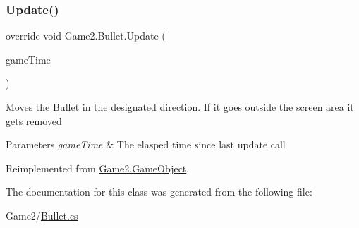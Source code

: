 \subsubsection{\texorpdfstring{Update()}{Update()}}
{\footnotesize\ttfamily override void Game2.\+Bullet.\+Update (\begin{DoxyParamCaption}\item[{Game\+Time}]{game\+Time }\end{DoxyParamCaption})\hspace{0.3cm}{\ttfamily [virtual]}}



Moves the \mbox{\hyperlink{class_game2_1_1_bullet}{Bullet}} in the designated direction. If it goes outside the screen area it gets removed 


\begin{DoxyParams}{Parameters}
{\em game\+Time} & The elasped time since last update call\\
\hline
\end{DoxyParams}


Reimplemented from \mbox{\hyperlink{class_game2_1_1_game_object_a360a294d8a55dcc747c44f8cc1aefe28}{Game2.\+Game\+Object}}.



The documentation for this class was generated from the following file\+:\begin{DoxyCompactItemize}
\item 
Game2/\mbox{\hyperlink{_bullet_8cs}{Bullet.\+cs}}\end{DoxyCompactItemize}
